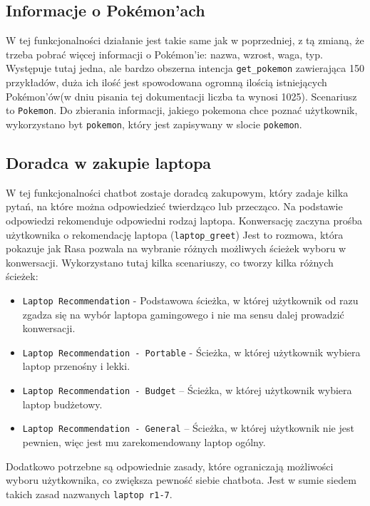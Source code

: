 \documentclass{article}
\begin{document}
\subsection{Informacje o Pokémon'ach}
W tej funkcjonalności działanie jest takie same jak w poprzedniej, z tą
zmianą, że trzeba pobrać więcej informacji o Pokémon'ie:
nazwa, wzrost, waga, typ. Występuje tutaj jedna, ale bardzo obszerna intencja 
\verb|get_pokemon| zawierająca 150 przykładów, duża ich ilość jest spowodowana
ogromną ilością istniejących Pokémon'ów(w dniu pisania tej dokumentacji liczba
ta wynosi 1025). Scenariusz to \verb|Pokemon|. Do zbierania informacji, jakiego
pokemona chce poznać użytkownik, wykorzystano byt \verb|pokemon|, który jest
zapisywany w slocie \verb|pokemon|.

\subsection{Doradca w zakupie laptopa}
W tej funkcjonalności chatbot zostaje doradcą zakupowym, który zadaje kilka
pytań, na które można odpowiedzieć twierdząco lub przecząco. Na podstawie
odpowiedzi rekomenduje odpowiedni rodzaj laptopa. Konwersację zaczyna prośba
użytkownika o rekomendację laptopa (\verb|laptop_greet|) Jest to rozmowa, która
pokazuje jak Rasa pozwala na wybranie różnych możliwych ścieżek wyboru w
konwersacji. Wykorzystano tutaj kilka scenariuszy, co tworzy kilka różnych
ścieżek:
\begin{itemize}
    \item[\textcolor{violet}{\textbullet}] \verb|Laptop Recommendation| - Podstawowa ścieżka, w której
        użytkownik od razu zgadza się na wybór laptopa gamingowego i nie ma
        sensu dalej prowadzić konwersacji.
    \item[\textcolor{violet}{\textbullet}] \verb|Laptop Recommendation - Portable| - Ścieżka, w której
        użytkownik wybiera laptop przenośny i lekki.
    \item[\textcolor{violet}{\textbullet}] \verb|Laptop Recommendation - Budget| -- Ścieżka, w której
        użytkownik wybiera laptop budżetowy. 
    \item[\textcolor{violet}{\textbullet}] \verb|Laptop Recommendation - General| -- Ścieżka, w której
        użytkownik nie jest pewnien, więc jest mu zarekomendowany laptop
        ogólny. 
\end{itemize}
Dodatkowo potrzebne są odpowiednie zasady, które ograniczają możliwości
wyboru użytkownika, co zwiększa pewność siebie chatbota. Jest w sumie siedem
takich zasad nazwanych \verb|laptop r1-7|.
\end{document}
